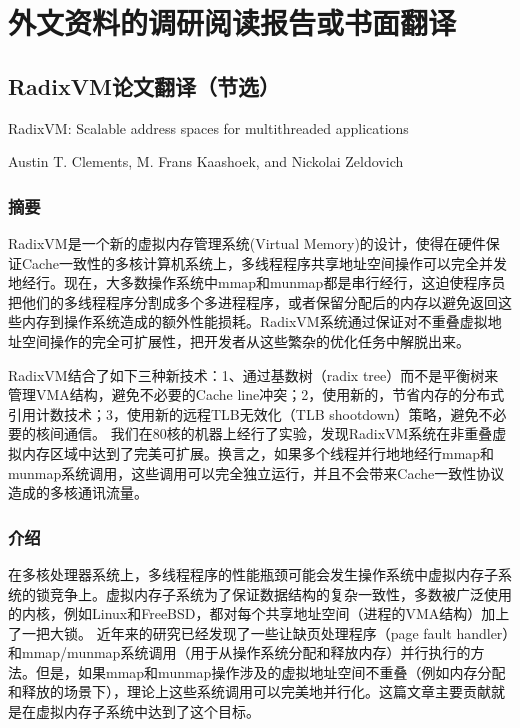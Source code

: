 
\chapter{外文资料的调研阅读报告或书面翻译}
\section{RadixVM论文翻译（节选）}
RadixVM: Scalable address spaces for multithreaded applications 

Austin T. Clements, M. Frans Kaashoek, and Nickolai Zeldovich


\subsection{摘要}

RadixVM是一个新的虚拟内存管理系统(Virtual
Memory)的设计，使得在硬件保证Cache一致性的多核计算机系统上，多线程程序共享地址空间操作可以完全并发地经行。现在，大多数操作系统中mmap和munmap都是串行经行，这迫使程序员把他们的多线程程序分割成多个多进程程序，或者保留分配后的内存以避免返回这些内存到操作系统造成的额外性能损耗。RadixVM系统通过保证对不重叠虚拟地址空间操作的完全可扩展性，把开发者从这些繁杂的优化任务中解脱出来。

RadixVM结合了如下三种新技术：1、通过基数树（radix
tree）而不是平衡树来管理VMA结构，避免不必要的Cache
line冲突；2，使用新的，节省内存的分布式引用计数技术；3，使用新的远程TLB无效化（TLB
shootdown）策略，避免不必要的核间通信。
我们在80核的机器上经行了实验，发现RadixVM系统在非重叠虚拟内存区域中达到了完美可扩展。换言之，如果多个线程并行地地经行mmap和munmap系统调用，这些调用可以完全独立运行，并且不会带来Cache一致性协议造成的多核通讯流量。


\subsection{介绍}
在多核处理器系统上，多线程程序的性能瓶颈可能会发生操作系统中虚拟内存子系统的锁竞争上。虚拟内存子系统为了保证数据结构的复杂一致性，多数被广泛使用的内核，例如Linux和FreeBSD，都对每个共享地址空间（进程的VMA结构）加上了一把大锁。
近年来的研究已经发现了一些让缺页处理程序（page fault
handler）和mmap/munmap系统调用（用于从操作系统分配和释放内存）并行执行的方法。但是，如果mmap和munmap操作涉及的虚拟地址空间不重叠（例如内存分配和释放的场景下），理论上这些系统调用可以完美地并行化。这篇文章主要贡献就是在虚拟内存子系统中达到了这个目标。

